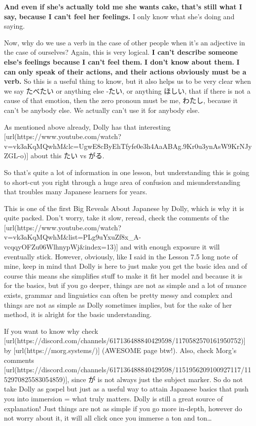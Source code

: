 {}

{\bf And even if she's actually told me she wants cake, that's still what I say, because I can't feel her feelings.} I only know what she's doing and saying.

Now, why do we use a verb in the case of other people when it's an adjective in the case of ourselves? Again, this is very logical. {\bf I can't describe someone else's feelings because I can't feel them.} {\bf I don't know about them.} {\bf I can only speak of their actions, and their actions obviously must be a verb.} So this is a useful thing to know, but it also helps us to be very clear when we say たべたい or anything else -たい, or anything ほしい, that if there is not a cause of that emotion, then the zero pronoun must be me, わたし, because it can't be anybody else. We actually can't use it for anybody else.

As mentioned above already, Dolly has that interesting [url(https://www.youtube.com/watch?v=vk3aKqMQwhM&lc=UgwE8cByEhTfyfe0e3h4AaABAg.9Kr0u3ynAsW9KrNJyZGL-o)] about this たい vs がる.

So that's quite a lot of information in one lesson, but understanding this is going to short-cut you right through a huge area of confusion and misunderstanding that troubles many Japanese learners for years.

This is one of the first Big Reveals About Japanese by Dolly, which is why it is quite packed. Don't worry, take it slow, reread, check the comments of the [url(https://www.youtube.com/watch?v=vk3aKqMQwhM&list=PLg9uYxuZf8x_A-vcqqyOFZu06WlhnypWj&index=13)] and with enough exposure it will eventually stick. However, obviously, like I said in the Lesson 7.5 long note of mine, keep in mind that Dolly is here to just make you get the basic idea and of course this means she simplifies stuff to make it fit her model and because it is for the basics, but if you go deeper, things are not as simple and a lot of nuance exists, grammar and linguistics can often be pretty messy and complex and things are not as simple as Dolly sometimes implies, but for the sake of her method, it is alright for the basic understanding.

If you want to know why check [url(https://discord.com/channels/617136488840429598/1170582570161950752)] by [url(https://morg.systems/)] (AWESOME page btw!). Also, check Morg's comments [url(https://discord.com/channels/617136488840429598/1151956209100927117/1152970825583054859)], since が is not always just the subject marker. So do not take Dolly as gospel but just as a useful way to attain Japanese basics that push you into immersion = what truly matters. Dolly is still a great source of explanation! Just things are not as simple if you go more in-depth, however do not worry about it, it will all click once you immerse a ton and ton\ldots{}

\stopsectionlevel

\stopsectionlevel

